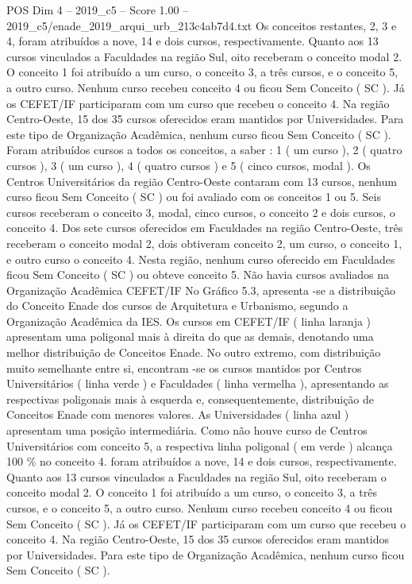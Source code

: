 \begin{textsample}{POS Dim 4 – 2019\_c5 – Score 1.00 – 2019\_c5/enade\_2019\_arqui\_urb\_213c4ab7d4.txt}
Os conceitos restantes, 2, 3 e 4, foram atribuídos a nove, 14 e dois cursos, respectivamente.
Quanto aos 13 cursos vinculados a Faculdades na região Sul, oito receberam o conceito modal 2.
O conceito 1 foi atribuído a um curso, o conceito 3, a três cursos, e o conceito 5, a outro curso.
Nenhum curso recebeu conceito 4 ou ficou Sem Conceito ( SC ).
Já os CEFET/IF participaram com um curso que recebeu o conceito 4.
Na região Centro-Oeste, 15 dos 35 cursos oferecidos eram mantidos por Universidades.
Para este tipo de Organização Acadêmica, nenhum curso ficou Sem Conceito ( SC ).
Foram atribuídos cursos a todos os conceitos, a saber : 1 ( um curso ), 2 ( quatro cursos ), 3 ( um curso ), 4 ( quatro cursos ) e 5 ( cinco cursos, modal ).
Os Centros Universitários da região Centro-Oeste contaram com 13 cursos, nenhum curso ficou Sem Conceito ( SC ) ou foi avaliado com os conceitos 1 ou 5.
Seis cursos receberam o conceito 3, modal, cinco cursos, o conceito 2 e dois cursos, o conceito 4.
Dos sete cursos oferecidos em Faculdades na região Centro-Oeste, três receberam o conceito modal 2, dois obtiveram conceito 2, um curso, o conceito 1, e outro curso o conceito 4.
Nesta região, nenhum curso oferecido em Faculdades ficou Sem Conceito ( SC ) ou obteve conceito 5.
Não havia cursos avaliados na Organização Acadêmica CEFET/IF No Gráfico 5.3, apresenta -se a distribuição do Conceito Enade dos cursos de Arquitetura e Urbanismo, segundo a Organização Acadêmica da IES.
Os cursos em CEFET/IF ( linha laranja ) apresentam uma poligonal mais à direita do que as demais, denotando uma melhor distribuição de Conceitos Enade.
No outro extremo, com distribuição muito semelhante entre si, encontram -se os cursos mantidos por Centros Universitários ( linha verde ) e Faculdades ( linha vermelha ), apresentando as respectivas poligonais mais à esquerda e, consequentemente, distribuição de Conceitos Enade com menores valores.
As Universidades ( linha azul ) apresentam uma posição intermediária.
Como não houve curso de Centros Universitários com conceito 5, a respectiva linha poligonal ( em verde ) alcança 100 \% no conceito 4. foram atribuídos a nove, 14 e dois cursos, respectivamente.
Quanto aos 13 cursos vinculados a Faculdades na região Sul, oito receberam o conceito modal 2.
O conceito 1 foi atribuído a um curso, o conceito 3, a três cursos, e o conceito 5, a outro curso.
Nenhum curso recebeu conceito 4 ou ficou Sem Conceito ( SC ).
Já os CEFET/IF participaram com um curso que recebeu o conceito 4.
Na região Centro-Oeste, 15 dos 35 cursos oferecidos eram mantidos por Universidades.
Para este tipo de Organização Acadêmica, nenhum curso ficou Sem Conceito ( SC ).

\end{textsample}
